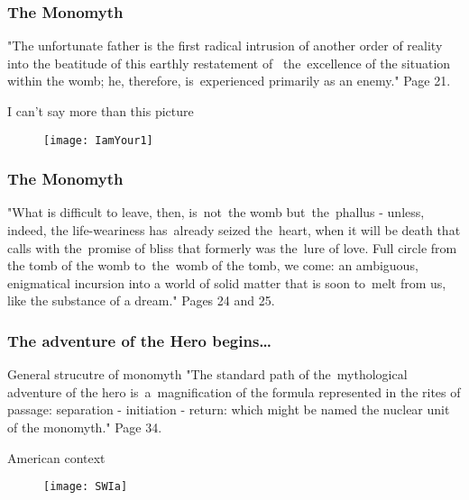 \documentclass[10pt,t]{beamer}
\begin{document}
\begin{frame}
  \frametitle{The Monomyth}

  \begin{block}{}
    "The unfortunate father is the first radical intrusion of another
    order of reality into the beatitude of this earthly restatement
    of~ the~excellence of the situation within the womb; he,
    therefore, is~experienced primarily as an enemy." Page 21.
  \end{block}
  \pause

  \begin{block}{I can't say more than this picture}
    \begin{figure}
      \centering

      \texttt{[image: IamYour1]}
    \end{figure}
  \end{block}

\end{frame}



\begin{frame}
  \frametitle{The Monomyth}

  \begin{block}{}
    "What is difficult to leave, then, is~not~the womb but~the~phallus
    - unless, indeed, the life-weariness has~already seized the~heart,
    when it will be death that calls with the~promise of bliss that
    formerly was the~lure of love. Full circle from the tomb of the
    womb to~the~womb of the tomb, we come: an ambiguous, enigmatical
    incursion into a world of solid matter that is soon to~melt from
    us, like the substance of a dream." Pages 24 and 25.
  \end{block}

\end{frame}



\begin{frame}
  \frametitle{The adventure of the Hero begins\ldots}

  \begin{block}{General strucutre of monomyth}
    "The standard path of the~mythological adventure of the hero
    is~a~magnification of the formula represented in the rites of
    passage: separation - initiation - return: which might be named
    the nuclear unit of the monomyth." Page 34.
  \end{block}

  \begin{block}{American context}
    \begin{figure}
      \centering

      \texttt{[image: SWIa]}
    \end{figure}
  \end{block}

\end{frame}
\end{document}
